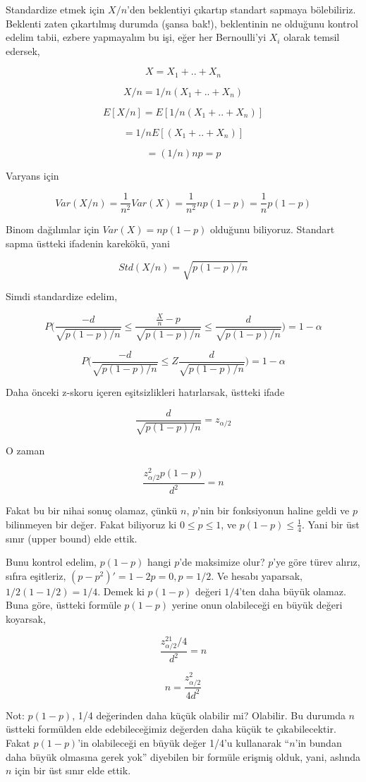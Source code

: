\documentclass[12pt,fleqn]{article}\usepackage{../../common}
\begin{document}
Standardize etmek için $X/n$'den beklentiyi çıkartıp standart sapmaya
bölebiliriz. Beklenti zaten çıkartılmış durumda (şansa bak!),
beklentinin ne olduğunu kontrol edelim tabii, ezbere yapmayalım bu işi,
eğer her Bernoulli'yi $X_i$ olarak temsil edersek,

$$ X = X_1 + .. + X_n $$

$$ X/n = 1/n(X_1 + .. + X_n )$$

$$ E[X/n] = E[1/n(X_1 + .. + X_n )]$$

$$  = 1/nE[(X_1 + .. + X_n )]$$

$$  = (1/n)np = p$$

Varyans için

$$
Var(X/n) = \frac{1}{n^2}Var(X) = \frac{1}{n^2}np(1-p)=
\frac{1}{n}p(1-p) 
$$

Binom dağılımlar için $Var(X) = np(1-p)$ olduğunu biliyoruz. Standart sapma
üstteki ifadenin karekökü, yani

$$ Std(X/n) = \sqrt{p(1-p)/n}
$$

Simdi standardize edelim,

$$ P\bigg( 
\frac{-d}{\sqrt{p(1-p)/n}} \le 
\frac{\frac{X}{n} - p }{\sqrt{p(1-p)/n}}\le 
\frac{d}{\sqrt{p(1-p)/n}} 
\bigg)  = 
1-\alpha$$


$$ P\bigg( 
\frac{-d}{\sqrt{p(1-p)/n}} \le 
Z
\frac{d}{\sqrt{p(1-p)/n}} 
\bigg)  = 
1-\alpha$$

Daha önceki z-skoru içeren eşitsizlikleri hatırlarsak, üstteki ifade 

$$ \frac{d}{\sqrt{p(1-p)/n}} = z_{\alpha/2} 
$$

O zaman 

$$ \frac{z_{\alpha/2}^2p(1-p)}{d^2} = n $$

Fakat bu bir nihai sonuç olamaz, çünkü $n$, $p$'nin bir fonksiyonun haline
geldi ve $p$ bilinmeyen bir değer. Fakat biliyoruz ki $0 \le p \le 1$, ve
$p(1-p) \le \frac{1}{4}$. Yani bir üst sınır (upper bound) elde ettik. 

Bunu kontrol edelim, $p(1-p)$ hangi $p$'de maksimize olur? $p$'ye göre
türev alırız, sıfıra eşitleriz, $(p-p^2)' = 1 - 2p = 0, p=1/2$. Ve hesabı
yaparsak, $1/2(1-1/2)=1/4$. Demek ki $p(1-p)$ değeri $1/4$'ten daha büyük
olamaz. Buna göre, üstteki formüle $p(1-p)$ yerine onun olabileceği en
büyük değeri koyarsak, 

$$ \frac{z_{\alpha/2}^21/4}{d^2} = n $$

$$ n = \frac{z_{\alpha/2}^2}{4d^2} $$

Not: $p(1-p)$, 1/4 değerinden daha küçük olabilir mi? Olabilir. Bu durumda
$n$ üstteki formülden elde edebileceğimiz değerden daha küçük te
çıkabilecektir. Fakat $p(1-p)$'in olabileceği en büyük değer 1/4'u
kullanarak ``$n$'in bundan daha büyük olmasına gerek yok'' diyebilen bir
formüle erişmiş olduk, yani, aslında $n$ için bir üst sınır elde ettik. 
\end{document}
